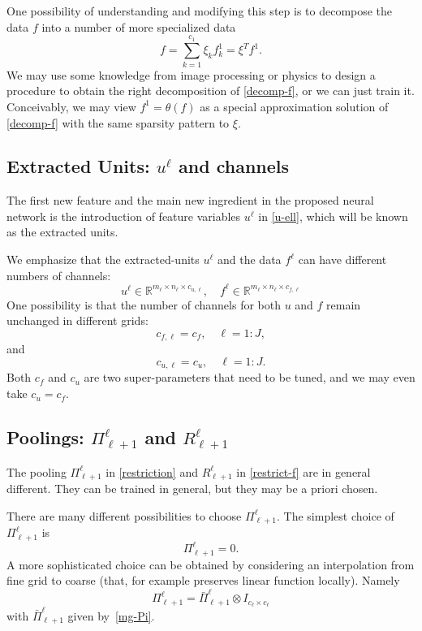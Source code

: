 One possibility of understanding and modifying this step 
is to decompose the data $f$ into a number of more
specialized data
\begin{equation}
\label{decomp-f}
f=\sum_{k=1}^{c_1}\xi_kf^1_k  =\xi^Tf^1.
\end{equation}
We may use some knowledge from image processing or physics to
design a procedure to obtain the right decomposition of
\eqref{decomp-f}, or we can just train it. 
Conceivably, we may view $f^{1} = \theta(f)$ as a special approximation solution of
\eqref{decomp-f} with the same sparsity pattern to $\xi$. 

\subsection{Extracted Units: $u^{\ell}$ and channels}
The first new feature and the main new ingredient 
in the proposed neural network is the introduction 
of feature variables  $u^{\ell}$ in \eqref{u-ell}, which will be known
as the extracted units. 

We emphasize that the extracted-units $u^\ell$ and the data $f^\ell$ can have
different numbers of channels:\
\begin{equation}
\label{uf-channels}
u^\ell\in \mathbb{R}^{m_\ell\times n_\ell \times c_{u,\ell}}, \quad
f^\ell\in \mathbb{R}^{m_\ell\times n_\ell \times c_{f,\ell} }
\end{equation}
One possibility is that the number of channels for both $u$ and $f$ remain
unchanged in different grids:  
\begin{equation}
\label{cfl}
c_{f,\ell}=c_f, \quad \ell=1:J,   
\end{equation}
and 
\begin{equation}
\label{ufl}
c_{u,\ell}=c_{u}, \quad \ell=1:J.   
\end{equation}
Both $c_f$ and $c_{u}$ are two super-parameters that need to be tuned, 
and we may even take $c_u = c_f$.

\subsection{Poolings: $\Pi_{\ell+1}^\ell$ and $R_{\ell+1}^\ell$}
The pooling $\Pi_{\ell+1}^\ell$ in \eqref{restriction} and
$R_{\ell+1}^\ell$ in \eqref{restrict-f} are in general different.
They can be trained in general, but they may be a priori chosen.

There are many different possibilities to choose $\Pi_{\ell+1}^\ell$. 
The simplest choice of $\Pi_{\ell+1}^\ell$ is 
\begin{equation}
\label{eq:8}
\Pi_{\ell+1}^\ell=0.
\end{equation}
A more sophisticated choice can be obtained by considering an
interpolation from fine grid to coarse (that, for example preserves linear function
locally).  Namely
\begin{equation}
\label{Pi}
\Pi_{\ell+1}^\ell=\bar\Pi_{\ell+1}^\ell \otimes I_{c_\ell\times c_\ell} 
\end{equation}
with $\bar\Pi_{\ell+1}^\ell$ given by~\eqref{mg-Pi}.



